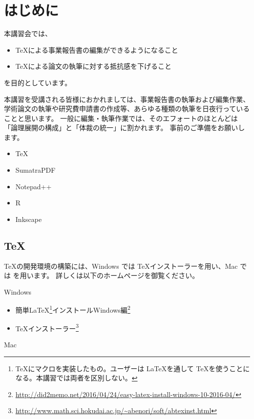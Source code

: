 \section{はじめに}

本講習会では、
\begin{itemize}
\item \TeX による事業報告書の編集ができるようになること
\item \TeX による論文の執筆に対する抵抗感を下げること
\end{itemize}
を目的としています。

本講習を受講される皆様におかれましては、事業報告書の執筆および編集作業、学術論文の執筆や研究費申請書の作成等、あらゆる種類の執筆を日夜行っていることと思います。
一般に編集・執筆作業では、そのエフォートのほとんどは「論理展開の構成」と「体裁の統一」に割かれます。
事前のご準備をお願いします。
\begin{itemize}
\item TeX
\item SumatraPDF
\item Notepad++
\item R
\item Inkscape
\end{itemize}

\subsection*{TeX}
\TeX の開発環境の構築には、Windows では \TeX インストーラーを用い、Mac では  を用います。
詳しくは以下のホームページを御覧ください。


\noindent Windows

\begin{itemize}
\item 簡単\LaTeX\footnote{\TeX にマクロを実装したもの。ユーザーは \LaTeX を通して \TeX を使うことになる。本講習では両者を区別しない。}インストールWindows編\footnote{\url{http://did2memo.net/2016/04/24/easy-latex-install-windows-10-2016-04/}}
\item \TeX インストーラー\footnote{\url{http://www.math.sci.hokudai.ac.jp/~abenori/soft/abtexinst.html}}
\end{itemize}



\noindent Mac




